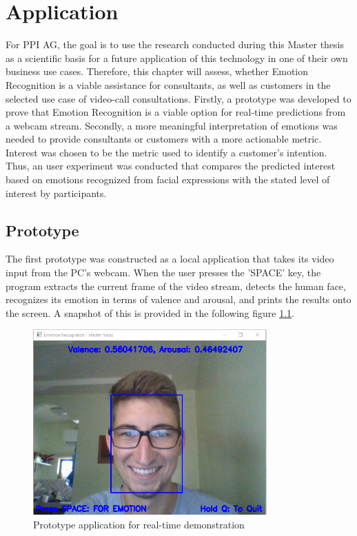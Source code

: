 
\chapter{Application}
For PPI AG, the goal is to use the research conducted during this Master thesis as a scientific basis for a future application of this technology in one of their own business use cases. Therefore, this chapter will assess, whether Emotion Recognition is a viable assistance for consultants, as well as customers in the selected use case of video-call consultations.
\newline\newline
Firstly, a prototype was developed to prove that Emotion Recognition is a viable option for real-time predictions from a webcam stream. Secondly, a more meaningful interpretation of emotions was needed to provide consultants or customers with a more actionable metric. Interest was chosen to be the metric used to identify a customer's intention. Thus, an user experiment was conducted that compares the predicted interest based on emotions recognized from facial expressions with the stated level of interest by participants.

\section{Prototype}
The first prototype was constructed as a local application that takes its video input from the PC's webcam. When the user presses the 'SPACE' key, the program extracts the current frame of the video stream, detects the human face, recognizes its emotion in terms of valence and arousal, and prints the results onto the screen. A snapshot of this is provided in the following figure \ref{fig:PrototypeRealTime}. 

\begin{figure}[H]
  \begin{center}
  \includegraphics[angle=0, width=0.8\textwidth]{Figures/webcam_foto.PNG}
  \caption{Prototype application for real-time demonstration}
  \label{fig:PrototypeRealTime}
  \end{center}
\end{figure}

